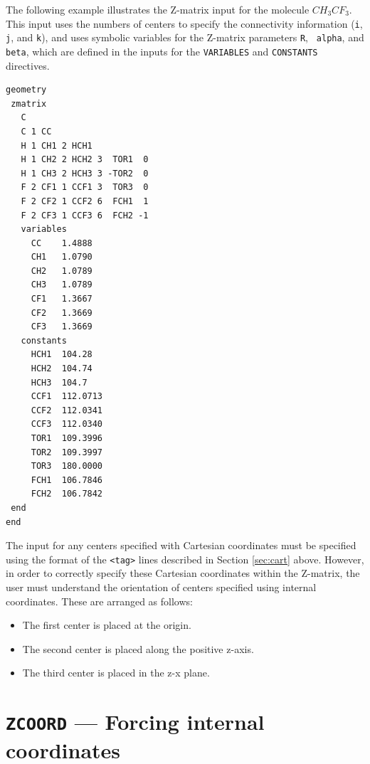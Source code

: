 The following example illustrates the Z-matrix input for the molecule
$CH_3CF_3$.  This input uses the numbers of centers to specify
the connectivity information (\verb+i+, \verb+j+, and \verb+k+), and
uses symbolic variables for the Z-matrix parameters {\tt R}, {\tt
  alpha}, and {\tt beta}, which are defined in the inputs for the
\verb+VARIABLES+ and
\verb+CONSTANTS+ directives.

\begin{verbatim}
geometry 
 zmatrix
   C 
   C 1 CC 
   H 1 CH1 2 HCH1 
   H 1 CH2 2 HCH2 3  TOR1  0 
   H 1 CH3 2 HCH3 3 -TOR2  0 
   F 2 CF1 1 CCF1 3  TOR3  0 
   F 2 CF2 1 CCF2 6  FCH1  1 
   F 2 CF3 1 CCF3 6  FCH2 -1
   variables
     CC    1.4888 
     CH1   1.0790 
     CH2   1.0789  
     CH3   1.0789  
     CF1   1.3667 
     CF2   1.3669 
     CF3   1.3669
   constants
     HCH1  104.28 
     HCH2  104.74 
     HCH3  104.7 
     CCF1  112.0713 
     CCF2  112.0341 
     CCF3  112.0340 
     TOR1  109.3996 
     TOR2  109.3997 
     TOR3  180.0000 
     FCH1  106.7846 
     FCH2  106.7842
 end   
end
\end{verbatim}

The input for any centers specified with Cartesian coordinates must
be specified using the format of the \verb+<tag>+ lines described
in Section \ref{sec:cart} above.  However, in
order to correctly specify these Cartesian coordinates 
within the Z-matrix, the user must
understand the orientation of centers specified using
internal coordinates.  These are arranged as follows:
\begin{itemize}
\item The first center is placed at the origin.
\item The second center is placed along the positive z-axis.
\item The third center is placed in the z-x plane.
\end{itemize}

\section{{\tt ZCOORD} --- Forcing internal coordinates}
\label{sec:zcoord}

